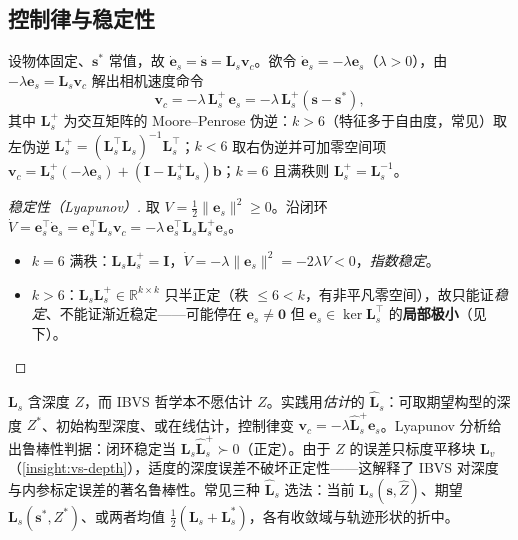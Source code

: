 \subsection{控制律与稳定性}
\label{sec:vs-ibvs-law}

\begin{theorem}\label{thm:vs-ibvs-law}
设物体固定、$\mathbf{s}^\ast$ 常值，故 $\dot{\mathbf{e}}_s=\dot{\mathbf{s}}=\mathbf{L}_s\mathbf{v}_c$。欲令 $\dot{\mathbf{e}}_s=-\lambda\mathbf{e}_s$（$\lambda>0$），由 $-\lambda\mathbf{e}_s=\mathbf{L}_s\mathbf{v}_c$ 解出相机速度命令
\begin{equation}
  \boxed{\;\mathbf{v}_c=-\lambda\,\mathbf{L}_s^{+}\,\mathbf{e}_s=-\lambda\,\mathbf{L}_s^{+}(\mathbf{s}-\mathbf{s}^\ast),\;}
  \label{eq:vs-ibvs-law}
\end{equation}
其中 $\mathbf{L}_s^{+}$ 为交互矩阵的 Moore--Penrose 伪逆：$k>6$（特征多于自由度，常见）取左伪逆 $\mathbf{L}_s^{+}=(\mathbf{L}_s^\top\mathbf{L}_s)^{-1}\mathbf{L}_s^\top$；$k<6$ 取右伪逆并可加零空间项 $\mathbf{v}_c=\mathbf{L}_s^{+}(-\lambda\mathbf{e}_s)+(\mathbf{I}-\mathbf{L}_s^{+}\mathbf{L}_s)\mathbf{b}$；$k=6$ 且满秩则 $\mathbf{L}_s^{+}=\mathbf{L}_s^{-1}$。
\end{theorem}

\begin{proof}[稳定性（Lyapunov）]
取 $V=\tfrac12\|\mathbf{e}_s\|^2\ge0$\cite{spong2006robot,hutchinson1996tutorial}。沿闭环 $\dot V=\mathbf{e}_s^\top\dot{\mathbf{e}}_s=\mathbf{e}_s^\top\mathbf{L}_s\mathbf{v}_c=-\lambda\,\mathbf{e}_s^\top\mathbf{L}_s\mathbf{L}_s^{+}\mathbf{e}_s$。
\begin{itemize}
  \item $k=6$ 满秩：$\mathbf{L}_s\mathbf{L}_s^{+}=\mathbf{I}$，$\dot V=-\lambda\|\mathbf{e}_s\|^2=-2\lambda V<0$，\emph{指数稳定}。
  \item $k>6$：$\mathbf{L}_s\mathbf{L}_s^{+}\in\mathbb{R}^{k\times k}$ 只半正定（秩 $\le6<k$，有非平凡零空间），故只能证\emph{稳定}、不能证渐近稳定——可能停在 $\mathbf{e}_s\neq\mathbf{0}$ 但 $\mathbf{e}_s\in\ker\mathbf{L}_s^\top$ 的\textbf{局部极小}（见下）。
\end{itemize}
\end{proof}

\begin{note}[深度未知与对标定误差的鲁棒性]\label{note:vs-depth-est}
$\mathbf{L}_s$ 含深度 $Z$，而 IBVS 哲学本不愿估计 $Z$。实践用\emph{估计}的 $\widehat{\mathbf{L}}_s$：可取期望构型的深度 $Z^\ast$、初始构型深度、或在线估计，控制律变 $\mathbf{v}_c=-\lambda\widehat{\mathbf{L}}_s^{+}\mathbf{e}_s$\cite{chaumette2006visual,siciliano2009robotics}。Lyapunov 分析给出鲁棒性判据：闭环稳定当 $\mathbf{L}_s\widehat{\mathbf{L}}_s^{+}\succ0$（正定）\cite{spong2006robot}。由于 $Z$ 的误差只标度平移块 $\mathbf{L}_v$（\cref{insight:vs-depth}），适度的深度误差不破坏正定性——这解释了 IBVS 对深度与内参标定误差的著名鲁棒性。常见三种 $\widehat{\mathbf{L}}_s$ 选法：当前 $\mathbf{L}_s(\mathbf{s},\widehat Z)$、期望 $\mathbf{L}_s(\mathbf{s}^\ast,Z^\ast)$、或两者均值 $\tfrac12(\mathbf{L}_s+\mathbf{L}_s^\ast)$，各有收敛域与轨迹形状的折中\cite{chaumette2006visual}。
\end{note}

